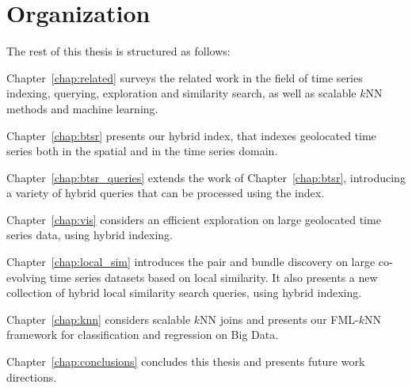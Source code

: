 \section{Organization}
\label{sec:org}

The rest of this thesis is structured as follows:

\begin{description}
	\item Chapter~\ref{chap:related} surveys the related work in the field of time series indexing, querying, exploration and similarity search, as well as scalable $k$NN methods and machine learning.
	\item Chapter~\ref{chap:btsr} presents our hybrid \btsr index, that indexes geolocated time series both in the spatial and in the time series domain.
	\item Chapter~\ref{chap:btsr_queries} extends the work of Chapter~\ref{chap:btsr}, introducing a variety of hybrid queries that can be processed using the \btsr index.
	\item Chapter~\ref{chap:vis} considers an efficient exploration on large geolocated time series data, using hybrid indexing.
	\item Chapter~\ref{chap:local_sim} introduces the pair and bundle discovery on large co-evolving time series datasets based on local similarity. It also presents a new collection of hybrid local similarity search queries, using hybrid indexing.
	\item Chapter~\ref{chap:knn} considers scalable $k$NN joins and presents our FML-$k$NN framework for classification and regression on Big Data.
	\item Chapter~\ref{chap:conclusions} concludes this thesis and presents future work directions.
\end{description}